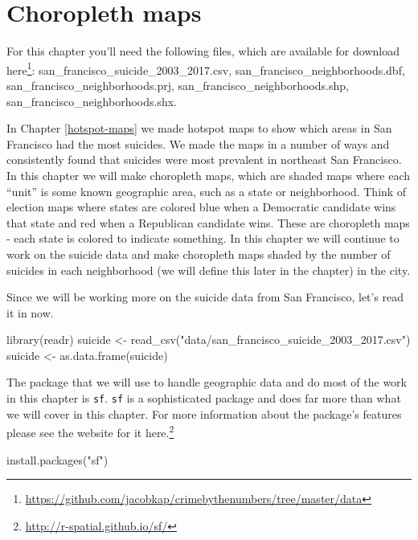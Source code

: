 \documentclass[
]{krantz}
\makeatletter
\newenvironment{Shaded}{\begin{snugshade}}{\end{snugshade}}
\newcommand{\FunctionTok}[1]{\textcolor[rgb]{0,0,0}{#1}}
\newcommand{\NormalTok}[1]{#1}
\newcommand{\OtherTok}[1]{\textcolor[rgb]{0.37,0.37,0.37}{#1}}
\newcommand{\StringTok}[1]{\textcolor[rgb]{0.5,0.5,0.5}{#1}}
\renewcommand{\href}[2]{#2\footnote{\url{#1}}}
\newenvironment{kframe}{%
\medskip{}
\setlength{\fboxsep}{.8em}
 \def\at@end@of@kframe{}%
 \ifinner\ifhmode%
  \def\at@end@of@kframe{\end{minipage}}%
  \begin{minipage}{\columnwidth}%
 \fi\fi%
 \def\FrameCommand##1{\hskip\@totalleftmargin \hskip-\fboxsep
 \colorbox{shadecolor}{##1}\hskip-\fboxsep
     \hskip-\linewidth \hskip-\@totalleftmargin \hskip\columnwidth}%
 \MakeFramed {\advance\hsize-\width
   \@totalleftmargin\z@ \linewidth\hsize
   \@setminipage}}%
 {\par\unskip\endMakeFramed%
 \at@end@of@kframe}
\renewenvironment{Shaded}{\begin{kframe}}{\end{kframe}}
\makeatother
\begin{document}
\hypertarget{choropleth-maps}{%
\chapter{Choropleth maps}\label{choropleth-maps}}

For this chapter you'll need the following files, which are
available for download
\href{https://github.com/jacobkap/crimebythenumbers/tree/master/data}{here}:
san\_francisco\_suicide\_2003\_2017.csv,
san\_francisco\_neighborhoods.dbf,
san\_francisco\_neighborhoods.prj,
san\_francisco\_neighborhoods.shp,
san\_francisco\_neighborhoods.shx.

In Chapter \ref{hotspot-maps} we made hotspot maps to show
which areas in San Francisco had the most suicides. We made
the maps in a number of ways and consistently found that
suicides were most prevalent in northeast San Francisco. In
this chapter we will make choropleth maps, which are shaded
maps where each ``unit'' is some known geographic area, such
as a state or neighborhood. Think of election maps where
states are colored blue when a Democratic candidate wins
that state and red when a Republican candidate wins. These
are choropleth maps - each state is colored to indicate
something. In this chapter we will continue to work on the
suicide data and make choropleth maps shaded by the number
of suicides in each neighborhood (we will define this later
in the chapter) in the city.

Since we will be working more on the suicide data from San
Francisco, let's read it in now.

\begin{Shaded}
\begin{Highlighting}[]
\FunctionTok{library}\NormalTok{(readr)}
\NormalTok{suicide }\OtherTok{\textless{}{-}} \FunctionTok{read\_csv}\NormalTok{(}\StringTok{"data/san\_francisco\_suicide\_2003\_2017.csv"}\NormalTok{)}
\NormalTok{suicide }\OtherTok{\textless{}{-}} \FunctionTok{as.data.frame}\NormalTok{(suicide)}
\end{Highlighting}
\end{Shaded}

The package that we will use to handle geographic data and
do most of the work in this chapter is \texttt{sf}.
\texttt{sf} is a sophisticated package and does far more
than what we will cover in this chapter. For more
information about the package's features please see the
website for it \href{http://r-spatial.github.io/sf/}{here.}

\begin{Shaded}
\begin{Highlighting}[]
\FunctionTok{install.packages}\NormalTok{(}\StringTok{"sf"}\NormalTok{)}
\end{Highlighting}
\end{Shaded}
\end{document}
